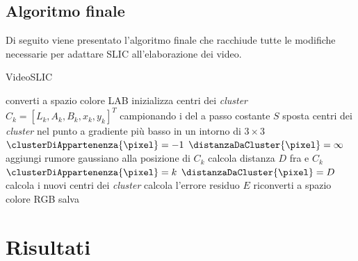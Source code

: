 \documentclass[12pt,a4paper,oneside]{article}
\begin{document}
\subsection{Algoritmo finale}
Di seguito viene presentato l'algoritmo finale che racchiude tutte le modifiche necessarie per adattare \gls{SLIC} all'elaborazione dei video.
\begin{algorithm}[!htb]
	\caption{VideoSLIC}
	\label{Alg_vers_final}
	\BlankLine
	\BlankLine
	{
	converti \frame a spazio colore \mbox{LAB}\;
	{
	inizializza centri dei \textit{cluster} $C_k = \left[L_k,A_k,B_k,x_k,y_k\right]^T$ campionando i \pixel del \frame a passo costante $S$\;
	sposta centri dei \textit{cluster} nel punto a gradiente più basso in un intorno di $3 \times 3$ \pixel\;
	{
	$\clusterDiAppartenenza{\pixel} = -1$\;
	$\distanzaDaCluster{\pixel} = \infty$\;
	}
	}
	{
	{
	aggiungi rumore gaussiano alla posizione di $C_k$\;
	}
	}
	{
	{
	{
	calcola distanza $D$ fra \pixel e $C_k$\;
	{
	$\clusterDiAppartenenza{\pixel} = k$\;
	$\distanzaDaCluster{\pixel} = D$\;
	}
	}
	}
	calcola i nuovi centri dei \textit{cluster}\;
	calcola l'errore residuo $E$\;
	}
	riconverti \frame a spazio colore \mbox{RGB}\;
	salva \frame\;
	}
\end{algorithm}
\newpage





\section{Risultati}\label{Risultati}
\end{document}
